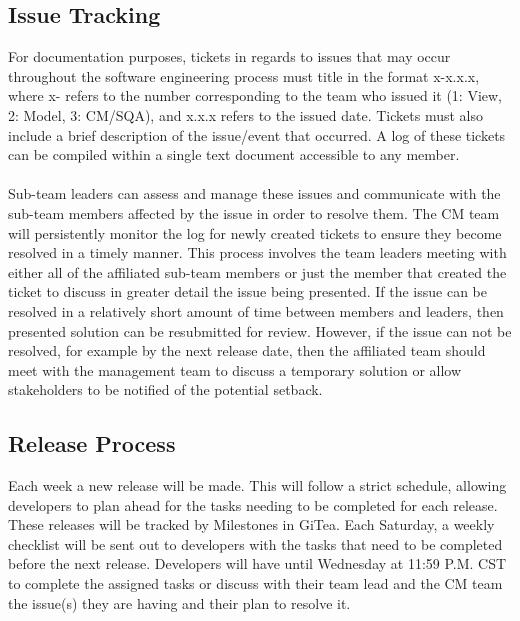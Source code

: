 \documentclass[letterpaper,12pt,oneside,listof=totoc]{scrreprt}
\begin{document}
\subsection{Issue Tracking}

For documentation purposes, tickets in regards to issues that may occur throughout the software engineering process must title in the format x-x.x.x, where x- refers to the number corresponding to the team who issued it (1: View, 2: Model, 3: CM/SQA), and x.x.x refers to the issued date. Tickets must also include a brief description of the issue/event that occurred. A log of these tickets can be compiled within a single text document accessible to any member. \\
\\
Sub-team leaders can assess and manage these issues and communicate with the sub-team members affected by the issue in order to resolve them. The CM team will persistently monitor the log for newly created tickets to ensure they become resolved in a timely manner. This process involves the team leaders meeting with either all of the affiliated sub-team members or just the member that created the ticket to discuss in greater detail the issue being presented. If the issue can be resolved in a relatively short amount of time between members and leaders, then presented solution can be resubmitted for review. However, if the issue can not be resolved, for example by the next release date, then the affiliated team should meet with the management team to discuss a temporary solution or allow stakeholders to be notified of the potential setback.

\subsection{Release Process}

Each week a new release will be made. This will follow a strict schedule, allowing developers to plan ahead for the tasks needing to be completed for each release. These releases will be tracked by Milestones in GiTea. Each Saturday, a weekly checklist will be sent out to developers with the tasks that need to be completed before the next release. Developers will have until Wednesday at 11:59 P.M. CST to complete the assigned tasks or discuss with their team lead and the CM team the issue(s) they are having and their plan to resolve it. 
\end{document}
